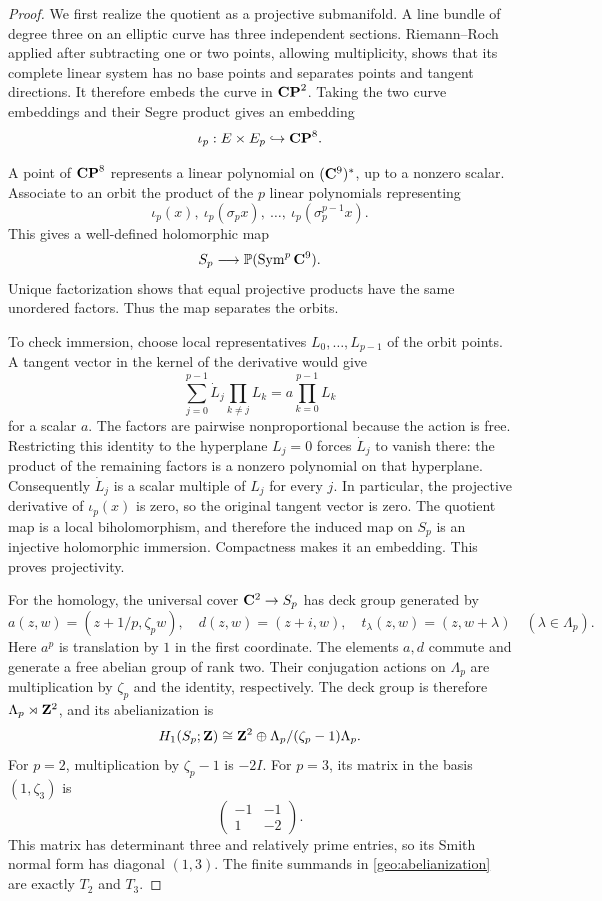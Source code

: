 \begin{proof}
We first realize the quotient as a projective submanifold. A line bundle
of degree three on an elliptic curve has three independent sections.
Riemann--Roch applied after subtracting one or two points, allowing
multiplicity, shows that its complete linear system has no base points
and separates points and tangent directions. It therefore embeds the
curve in $\mathbf{CP}^2$. Taking the two curve embeddings and their Segre product
gives an embedding
\[
 \iota_p:E\times E_p\hookrightarrow\mathbf{CP}^8.
\]

A point of $\mathbf{CP}^8$ represents a linear polynomial on $(\mathbf C^9)^*$, up to
a nonzero scalar. Associate to an orbit the product of the $p$ linear
polynomials representing
\[
 \iota_p(x),\ \iota_p(\sigma_p x),\ \ldots,
 \ \iota_p(\sigma_p^{p-1}x).
\]
This gives a well-defined holomorphic map
\[
 S_p\longrightarrow\mathbb P(\operatorname{Sym}^p\mathbf C^9).
\]
Unique factorization shows that equal projective products have the same
unordered factors. Thus the map separates the orbits.

To check immersion, choose local representatives $L_0,\ldots,L_{p-1}$
of the orbit points. A tangent vector in the kernel of the derivative
would give
\[
 \sum_{j=0}^{p-1}\dot L_j\prod_{k\ne j}L_k
       =a\prod_{k=0}^{p-1}L_k
\]
for a scalar $a$. The factors are pairwise nonproportional because the
action is free. Restricting this identity to the hyperplane $L_j=0$
forces $\dot L_j$ to vanish there: the product of the remaining factors
is a nonzero polynomial on that hyperplane. Consequently $\dot L_j$ is
a scalar multiple of $L_j$ for every $j$. In particular, the projective
derivative of $\iota_p(x)$ is zero, so the original tangent vector is
zero. The quotient map is a local biholomorphism, and therefore the
induced map on $S_p$ is an injective holomorphic immersion. Compactness
makes it an embedding. This proves projectivity.

For the homology, the universal cover $\mathbf C^2\to S_p$ has deck group
generated by
\[
 a(z,w)=(z+1/p,\zeta_p w),\quad
 d(z,w)=(z+i,w),\quad
 t_\lambda(z,w)=(z,w+\lambda)\quad(\lambda\in\Lambda_p).
\]
Here $a^p$ is translation by $1$ in the first coordinate. The elements
$a,d$ commute and generate a free abelian group of rank two. Their
conjugation actions on $\Lambda_p$ are multiplication by $\zeta_p$ and
the identity, respectively. The deck group is therefore
$\Lambda_p\rtimes\mathbf Z^2$, and its abelianization is
\begin{equation}
\label{geo:abelianization}
 H_1(S_p;\mathbf Z)\cong
 \mathbf Z^2\oplus\Lambda_p/(\zeta_p-1)\Lambda_p.
\end{equation}
For $p=2$, multiplication by $\zeta_p-1$ is $-2I$. For $p=3$, its
matrix in the basis $(1,\zeta_3)$ is
\[
 \begin{pmatrix}-1&-1\\1&-2\end{pmatrix}.
\]
This matrix has determinant three and relatively prime entries, so its
Smith normal form has diagonal $(1,3)$. The finite summands in
\eqref{geo:abelianization} are exactly $T_2$ and $T_3$.


\end{proof}
